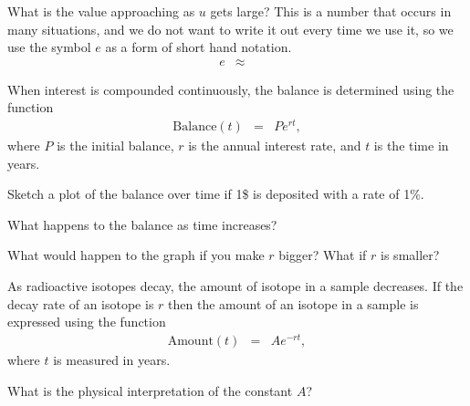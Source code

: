 \begin{problem}
\begin{subproblem}
  \item What is the value approaching as $u$ gets large? This is a
    number that occurs in many situations, and we do not want to write
    it out every time we use it, so we use the symbol $e$ as a form of
    short hand notation.
    \begin{eqnarray*}
      e & \approx & 
    \end{eqnarray*}
    
  \end{subproblem}

  \clearpage

\item When interest is compounded continuously, the balance is
  determined using the function
  \begin{eqnarray*}
    \mathrm{Balance}(t) & = & P e^{rt},
  \end{eqnarray*}
  where $P$ is the initial balance, $r$ is the annual interest rate,
  and $t$ is the time in years.

  \begin{subproblem}
  \item Sketch a plot of the balance over time if 1\$ is deposited with a
    rate of 1\%.

    \vfill

  \item What happens to the balance as time increases?

    \vspace{3em}

  \item What would happen to the graph if you make $r$ bigger? What if
    $r$ is smaller?

    \vspace{3em}
  \end{subproblem}
\clearpage

\item As radioactive isotopes decay, the amount of isotope in a sample
  decreases. If the decay rate of an isotope is $r$ then the amount of
  an isotope in a sample is expressed using the function
  \begin{eqnarray*}
    \mathrm{Amount}(t) & = & A e^{-rt},
  \end{eqnarray*}
  where $t$ is measured in years.

  \begin{subproblem}
  \item What is the physical interpretation of the constant $A$?
    \vspace{2em}


\end{subproblem}
\end{problem}
